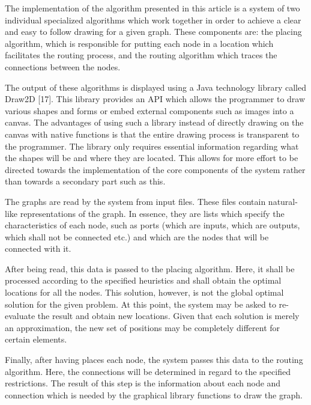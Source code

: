 \label{chap:arch}

The implementation of the algorithm presented in this article is a system of two individual 
specialized algorithms which work together in order to achieve a clear and easy to follow drawing for a given graph.
 These components are: the placing algorithm, which is responsible for putting each node in a location
which facilitates the routing process, and the routing algorithm which traces the
connections between the nodes. 

The output of these algorithms is displayed using a Java technology library called Draw2D [17].
This library provides an API which allows the programmer to draw various shapes and forms or
embed external components such as images into a canvas. The advantages of using such a 
library instead of directly drawing on the canvas with native functions is that the entire
drawing process is transparent to the programmer. The library only requires essential 
information regarding what the shapes will be and where they are located. This allows for 
more effort to be directed towards the implementation of the core components of the system
rather than towards a secondary part such as this.

The graphs are read by the system from input files. These files contain natural-like
representations of the graph. In essence, they are lists which specify the characteristics
of each node, such as ports (which are inputs, which are outputs, which shall not be 
connected etc.) and which are the nodes that will be connected with it.

After being read, this data is passed to the placing algorithm. Here, it shall be processed 
according to the specified heuristics and shall obtain the optimal locations for all the
nodes. This solution, however, is not the global optimal solution for the given problem. At 
this point, the system may be asked to re-evaluate the result and obtain new locations. Given
that each solution is merely an approximation, the new set of positions may be completely
different for certain elements.

Finally, after having places each node, the system passes this data to the routing algorithm.
Here, the connections will be determined in regard to the specified restrictions. The result of 
this step is the information about each node and connection which is needed by the graphical
library functions to draw the graph.
